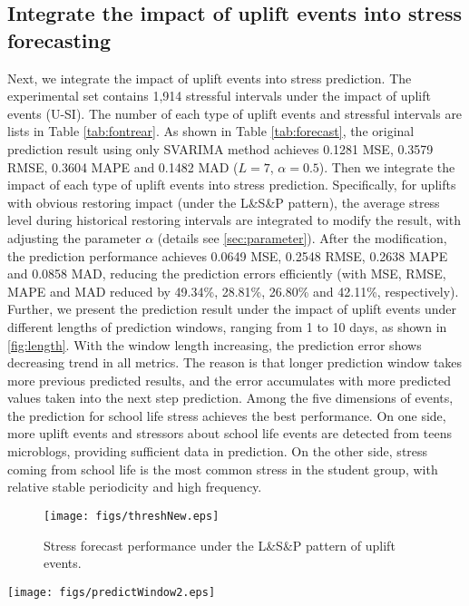\subsection{Integrate the impact of uplift events into stress forecasting}
Next, we integrate the impact of uplift events into stress prediction.
The experimental set contains 1,914 stressful intervals under the impact of uplift events (U-SI).
The number of each type of uplift events and stressful intervals are lists in Table \ref{tab:fontrear}.
As shown in Table \ref{tab:forecast},
the original prediction result using only SVARIMA method
achieves 0.1281 MSE, 0.3579 RMSE, 0.3604 MAPE and 0.1482 MAD ($L = 7$, $\alpha = 0.5$).
Then we integrate the impact of each type of uplift events into stress prediction.
Specifically, for uplifts with obvious restoring impact (under the L\&S\&P pattern),
the average stress level during historical restoring intervals are integrated to modify the result,
with adjusting the parameter $\alpha$ (details see \ref{sec:parameter}).
After the modification,
the prediction performance achieves 0.0649 MSE,	0.2548 RMSE, 0.2638 MAPE and 0.0858 MAD, 
reducing the prediction errors efficiently (with MSE, RMSE, MAPE and MAD reduced by 49.34\%, 28.81\%, 26.80\% and 42.11\%, respectively). %
Further,
we present the prediction result under the impact of uplift events under different lengths of prediction windows,
ranging from 1 to 10 days, as shown in \ref{fig:length}.
With the window length increasing,
the prediction error shows decreasing trend in all metrics.
The reason is that longer prediction window takes more previous predicted results,
and the error accumulates with more predicted values taken into the next step prediction.
Among the five dimensions of events,
the prediction for school life stress achieves the best performance.
On one side,
more uplift events and stressors about school life events are detected from teens microblogs,
providing sufficient data in prediction.
On the other side,
stress coming from school life is the most common stress in the student group,
with relative stable periodicity and high frequency.

\begin{figure}
\centering
\caption{Stress forecast performance under the L\&S\&P pattern of uplift events.}
\texttt{[image: figs/threshNew.eps]}
\label{fig:thresh}
\end{figure}

\begin{figure*}
\centering
\caption{Teens' stress forecast performance under different lengths of predicting windows.}
\texttt{[image: figs/predictWindow2.eps]}
\label{fig:length}
\end{figure*}

